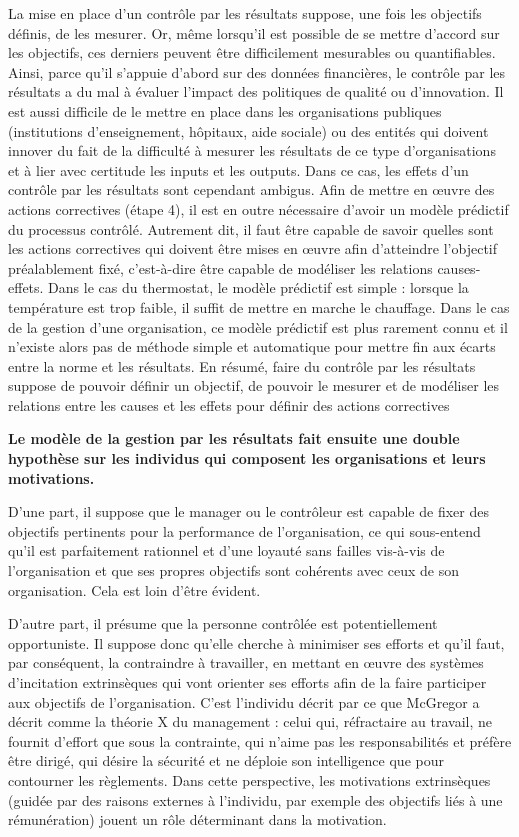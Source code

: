 \documentclass[oneside]{kaobook}
\begin{document}
La mise en place d’un contrôle par les résultats suppose, une fois les objectifs définis, de les mesurer. Or, même lorsqu’il est possible de se mettre d’accord sur les objectifs, ces derniers peuvent être difficilement mesurables ou quantifiables. Ainsi, parce qu’il s’appuie d’abord sur des données financières, le contrôle par les résultats a du mal à évaluer l’impact des politiques de qualité ou d’innovation. Il est aussi difficile de le mettre en place dans les organisations publiques (institutions d’enseignement, hôpitaux, aide sociale) ou des entités qui doivent innover du fait de la difficulté à mesurer les résultats de ce type d’organisations et à lier avec certitude les inputs et les outputs. Dans ce cas, les effets d’un contrôle par les résultats sont cependant ambigus. Afin de mettre en œuvre des actions correctives (étape 4), il est en outre nécessaire d’avoir un modèle prédictif du processus contrôlé. Autrement dit, il faut être capable de savoir quelles sont les actions correctives qui doivent être mises en œuvre afin d’atteindre l’objectif préalablement fixé, c’est-à-dire être capable de modéliser les relations causes-effets. Dans le cas du thermostat, le modèle prédictif est simple : lorsque la température est trop faible, il suffit de mettre en marche le chauffage. Dans le cas de la gestion d’une organisation, ce modèle prédictif est plus rarement connu et il n’existe alors pas de méthode simple et automatique pour mettre fin aux écarts entre la norme et les résultats.
En résumé, faire du contrôle par les résultats suppose de pouvoir définir un objectif, de pouvoir le mesurer et de modéliser les relations entre les causes et les effets pour définir des actions correctives

\textbf{Le modèle de la gestion par les résultats fait ensuite une double hypothèse sur les individus qui composent les organisations et leurs motivations.}

D’une part, il suppose que le manager ou le contrôleur est capable de fixer des objectifs pertinents pour la performance de l’organisation, ce qui sous-entend qu'il est parfaitement rationnel et d’une loyauté sans failles vis-à-vis de l’organisation et que ses propres objectifs sont cohérents avec ceux de son organisation. Cela est loin d’être évident.

D’autre part, il présume que la personne contrôlée est potentiellement opportuniste. Il suppose donc qu’elle cherche à minimiser ses efforts et qu’il faut, par conséquent, la contraindre à travailler, en mettant en œuvre des systèmes d’incitation extrinsèques qui vont orienter ses efforts afin de la faire participer aux objectifs de l’organisation. C’est l’individu décrit par ce que McGregor a décrit comme la théorie X du management : celui qui, réfractaire au travail, ne fournit d’effort que sous la contrainte, qui n’aime pas les responsabilités et préfère être dirigé, qui désire la sécurité et ne déploie son intelligence que pour contourner les règlements.
Dans cette perspective, les motivations extrinsèques (guidée par des raisons externes à l’individu, par exemple des objectifs liés à une rémunération) jouent un rôle déterminant dans la motivation.
\end{document}
